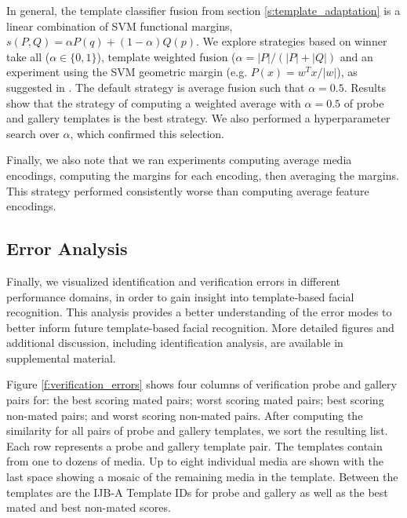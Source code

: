\documentclass[10pt,twocolumn,letterpaper]{article}
\theoremstyle{definition}		\newtheorem{defn}[thm]{Definition}
\begin{document}
In general, the template classifier fusion from section \ref{s:template_adaptation} is a linear combination of SVM functional margins,  $s(P,Q)=\alpha P(q) + (1-\alpha)Q(p)$.  We explore strategies based on winner take all ($\alpha \in \{0,1 \}$), template weighted fusion ($\alpha=|P|/(|P|+|Q|)$ and an experiment using the SVM geometric margin (e.g. $P(x) = w^Tx / |w|$), as suggested in \cite{Kobayashi15}.  The default strategy is average fusion such that $\alpha=0.5$.  Results show that the strategy of computing a weighted average with $\alpha=0.5$ of probe and gallery templates is the best strategy.  We also performed a hyperparameter search over $\alpha$, which confirmed this selection.  

Finally, we also note that we ran experiments computing average media encodings, computing the margins for each encoding, then averaging the margins.  This strategy performed consistently worse than computing average feature encodings.




\subsection{Error Analysis}
\label{ss:errors}




Finally, we visualized identification and verification errors in different performance domains, in order to gain insight into template-based facial recognition.  This analysis provides a better understanding of the error modes to better inform future template-based facial recognition.  More detailed figures and additional discussion, including identification analysis, are available in supplemental material.




 
Figure \ref{f:verification_errors} shows four columns of verification probe and gallery pairs for: the best scoring mated pairs; worst scoring mated pairs; best scoring non-mated pairs; and worst scoring non-mated pairs.  After computing the similarity for all pairs of probe and gallery templates, we sort the resulting list.  Each row represents a probe and gallery template pair.  The templates contain from one to dozens of media.  Up to eight individual media are shown with the last space showing a mosaic of the remaining media in the template.  Between the templates are the IJB-A Template IDs for probe and gallery as well as the best mated and best non-mated scores.
 
\end{document}
